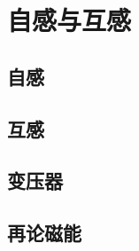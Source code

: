 

\section{自感与互感}\label{19-3}

\subsection{自感}\label{19-3-1}

\subsection{互感}\label{19-3-2}

\subsection{变压器}\label{19-3-2}

\subsection{再论磁能}\label{19-3-3}

